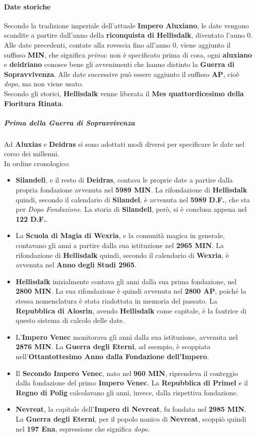 \documentclass[10pt,twoside,onecolumn,openany]{book}
\begin{document}
\paragraph{Date storiche} Secondo la tradizione imperiale dell'attuale \textbf{Impero Aluxiano}, le date vengono scandite a partire dall'anno della \textbf{riconquista di Hellisdalk}, diventato l'anno 0. Alle date precedenti, contate alla rovescia fino all'anno 0, viene aggiunto il suffisso \textbf{MIN}, che significa \textit{prima}: non è specificato prima di cosa, ogni \textbf{aluxiano} e \textbf{deidriano} conosce bene gli avvenimenti che hanno distinto la \textbf{Guerra di Sopravvivenza}. Alle date successive può essere aggiunto il suffisso \textbf{AP}, cioè \textit{dopo}, ma non viene usato.\\
Secondo gli storici, \textbf{Hellisdalk} venne liberata il \textbf{Mes quattordicesimo della Fioritura Rinata}.\\
\subparagraph{Prima della Guerra di Sopravvivenza} Ad \textbf{Aluxias} e \textbf{Deidras} si sono adottati modi diversi per specificare le date nel corso dei millenni.\\
In ordine cronologico:
\begin{itemize}
\item \textbf{Silandell}, e il resto di \textbf{Deidras}, contava le proprie date a partire dalla propria fondazione avvenuta nel \textbf{5989 MIN}. La rifondazione di \textbf{Hellisdalk} quindi, secondo il calendario di \textbf{Silandel}, è avvenuta nel \textbf{5989 D.F.}, che sta per \textit{Dopo Fondazione}. La storia di \textbf{Silandell}, però, si è conclusa appena nel \textbf{122 D.F.}.
\item La \textbf{Scuola di Magia di Wexria}, e la comunità magica in generale, contavano gli anni a partire dalla sua istituzione nel \textbf{2965 MIN}. La rifondazione di \textbf{Hellisdalk} quindi, secondo il calendario di \textbf{Wexria}, è avvenuta nel \textbf{Anno degli Studi 2965}.
\item \textbf{Hellisdalk} inizialmente contava gli anni dalla sua prima fondazione, nel \textbf{2800 MIN}. La sua rifondazione è quindi avvenuta nel \textbf{2800 AP}, poiché la stessa nomenclatura è stata riadottata in memoria del passato. La \textbf{Repubblica di Alosrin}, avendo \textbf{Hellisdalk} come capitale, è la fautrice di questo sistema di calcolo delle date.
\item L'\textbf{Impero Venec} monitorava gli anni dalla sua istituzione, avvenuta nel \textbf{2876 MIN}. La \textbf{Guerra degli Eterni}, ad esempio, è scoppiata nell'\textbf{Ottantottesimo Anno dalla Fondazione dell'Impero}.
\item Il \textbf{Secondo Impero Venec}, nato nel \textbf{960 MIN}, riprendeva il conteggio dalla fondazione del primo \textbf{Impero Venec}. La \textbf{Repubblica di Primel} e il \textbf{Regno di Polig} calcolavano gli anni, invece, dalla rispettiva fondazione.
\item \textbf{Nevreat}, la capitale dell'\textbf{Impero di Nevreat}, fu fondata nel \textbf{2985 MIN}. La \textbf{Guerra degli Eterni}, per il popolo nanico di \textbf{Nevreat}, scoppiò quindi nel \textbf{197 Ena}, espressione che significa \textit{dopo}.
\end{itemize}
\end{document}
